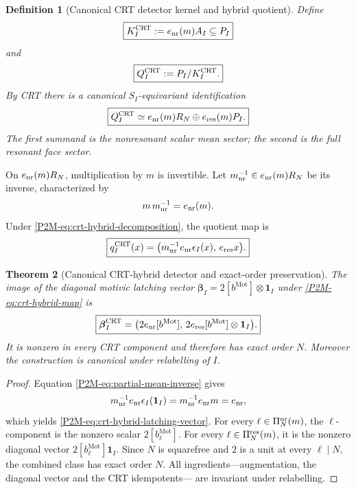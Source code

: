 \documentclass[11pt]{article}
\newtheorem{theorem}{Theorem}[section]
\newtheorem{definition}[theorem]{Definition}
\theoremstyle{remark}
\newcommand{\Mot}{\mathrm{Mot}}
\begin{document}
\begin{definition}[Canonical CRT detector kernel and hybrid quotient]
\label{P2M-def:crt-hybrid-quotient}
Define
\begin{equation}\label{P2M-eq:crt-hybrid-kernel}
 \boxed{
 K_I^{\rm CRT}
 :=e_{\rm nr}(m)A_I\subseteq P_I}
\end{equation}
and
\begin{equation}
 \boxed{
 Q_I^{\rm CRT}
 :=P_I/K_I^{\rm CRT}.}
\end{equation}
By CRT there is a canonical \(S_I\)-equivariant identification
\begin{equation}\label{P2M-eq:crt-hybrid-decomposition}
 \boxed{
 Q_I^{\rm CRT}
 \simeq
 e_{\rm nr}(m)R_N
 \oplus
 e_{\rm res}(m)P_I.}
\end{equation}
The first summand is the nonresonant scalar mean sector; the second is the
full resonant face sector.
\end{definition}

On \(e_{\rm nr}(m)R_N\), multiplication by \(m\) is invertible.  Let
\(m_{\rm nr}^{-1}\in e_{\rm nr}(m)R_N\) be its inverse, characterized by
\begin{equation}\label{P2M-eq:partial-mean-inverse}
 m\,m_{\rm nr}^{-1}=e_{\rm nr}(m).
\end{equation}
Under \eqref{P2M-eq:crt-hybrid-decomposition}, the quotient map is
\begin{equation}\label{P2M-eq:crt-hybrid-map}
 \boxed{
 q_I^{\rm CRT}(x)
 =\bigl(m_{\rm nr}^{-1}e_{\rm nr}\epsilon_I(x),\,
        e_{\rm res}x\bigr).}
\end{equation}

\begin{theorem}[Canonical CRT-hybrid detector and exact-order preservation]
\label{P2M-thm:crt-hybrid-exact-order}
The image of the diagonal motivic latching vector
\(\boldsymbol\beta_I=2[b^{\Mot}]\otimes\mathbf1_I\) under
\eqref{P2M-eq:crt-hybrid-map} is
\begin{equation}\label{P2M-eq:crt-hybrid-latching-vector}
 \boxed{
 \boldsymbol\beta_I^{\rm CRT}
 =\bigl(2e_{\rm nr}[b^{\Mot}],\,
        2e_{\rm res}[b^{\Mot}]\otimes\mathbf1_I\bigr).}
\end{equation}
It is nonzero in every CRT component and therefore has exact order \(N\).
Moreover the construction is canonical under relabelling of \(I\).
\end{theorem}

\begin{proof}
Equation \eqref{P2M-eq:partial-mean-inverse} gives
\[
 m_{\rm nr}^{-1}e_{\rm nr}\epsilon_I(\mathbf1_I)
 =m_{\rm nr}^{-1}e_{\rm nr}m=e_{\rm nr},
\]
which yields \eqref{P2M-eq:crt-hybrid-latching-vector}.  For every
\(\ell\in\Pi_N^{\rm nr}(m)\), the \(\ell\)-component is the nonzero scalar
\(2[b^{\Mot}_\ell]\).  For every
\(\ell\in\Pi_N^{\rm res}(m)\), it is the nonzero diagonal vector
\(2[b^{\Mot}_\ell]\mathbf1_I\).  Since \(N\) is squarefree and \(2\) is a
unit at every \(\ell\mid N\), the combined class has exact order \(N\).
All ingredients---augmentation, the diagonal vector and the CRT idempotents---
are invariant under relabelling.
\end{proof}
\end{document}
